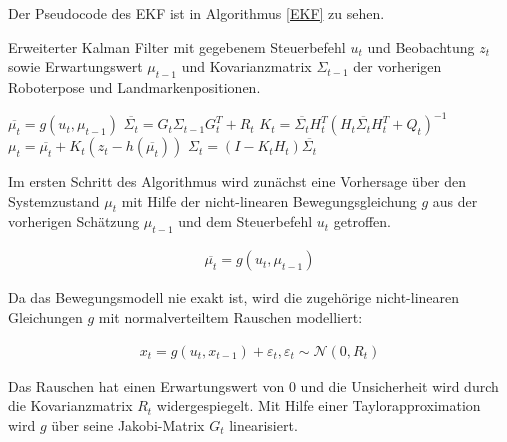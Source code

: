 Der Pseudocode des EKF ist in Algorithmus \ref{EKF} zu sehen. 
\begin{algorithm}
	\caption{Erweiterter Kalman Filter mit gegebenem Steuerbefehl $ u_t $ und Beobachtung $ z_t $ sowie Erwartungswert $ \mu_{t-1} $ und Kovarianzmatrix $ \Sigma_{t-1} $ der vorherigen Roboterpose und Landmarkenpositionen.}
	\label{EKF}
	\begin{algorithmic}[1]
			\State $ \overline{\mu_t} = g(u_t,\mu_{t-1}) $
			\State $ \overline{\Sigma_t} = G_t \Sigma_{t-1} G_t^T + R_t $
			\State $ K_t = \overline{\Sigma_t} H_t^T(H_t \overline{\Sigma_t} H_t^T + Q_t)^{-1} $
			\State $ \mu_t = \overline{\mu_t} + K_t(z_t - h(\overline{\mu_t})) $
			\State $ \Sigma_t = (I - K_t H_t) \overline{\Sigma_t} $
			\State {}
		\EndFunction
	\end{algorithmic}
\end{algorithm}

Im ersten Schritt des Algorithmus wird zunächst eine Vorhersage über den Systemzustand $ \mu_t $ mit Hilfe der nicht-linearen Bewegungsgleichung $ g $ aus der vorherigen Schätzung $ \mu_{t-1} $ und dem Steuerbefehl $ u_t $ getroffen.

\begin{align}
	\overline{\mu_t} = g(u_t,\mu_{t-1})
\end{align}

Da das Bewegungsmodell nie exakt ist, wird die zugehörige nicht-linearen Glei\-chung\-en $ g $ mit normalverteiltem Rauschen modelliert:

\begin{align}
	x_t  = g(u_t,x_{t-1})+\varepsilon_t,	\varepsilon_t \sim \mathcal{N}(0,R_t) 
\end{align}

Das Rauschen hat einen Erwartungswert von $ 0 $ und die Unsicherheit wird durch die Kovarianzmatrix $ R_t $ widergespiegelt. Mit Hilfe einer Taylorapproximation wird $g$ über seine Jakobi-Matrix $G_t$ linearisiert. 

